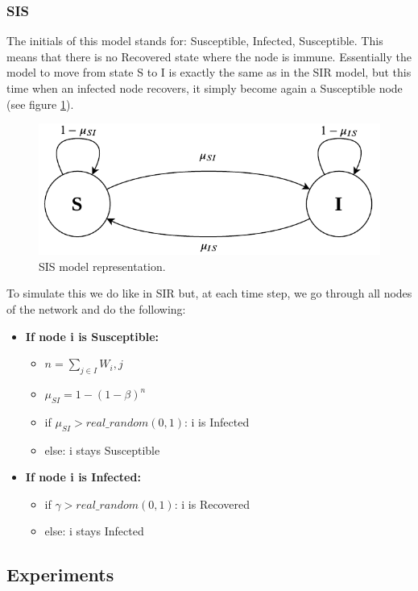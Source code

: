 \subsubsection{SIS}
The initials of this model stands for: Susceptible, Infected, Susceptible. This means that there is no Recovered state where the node is immune. Essentially the model to move from state S to I is exactly the same as in the SIR model, but this time when an infected node recovers, it simply become again a Susceptible node (see figure \ref{fig:sis}).
\begin{figure}[htbp]
    \centering
    \includegraphics[width=\linewidth]{../img/SIS_model.pdf}
    \caption{SIS model representation.}
    \label{fig:sis}
\end{figure}

To simulate this we do like in SIR but, at each time step, we go through all nodes of the network and do the following:
\begin{itemize}
    \item \textbf{If node i is Susceptible:} 
    \begin{itemize}
        \item[] $n=\sum_{j\in I}W_i,j$
        \item[] $\mu_{SI}=1-(1-\beta)^n$
        \item[] if $\mu_{SI}>real\_random(0,1)$: i is Infected
        \item[] else: i stays Susceptible  
    \end{itemize}
    \item \textbf{If node i is Infected:} 
    \begin{itemize}
        \item[] if $\gamma>real\_random(0,1)$: i is Recovered
        \item[] else: i stays Infected
    \end{itemize}
\end{itemize}
\subsection{Experiments}
\label{ssec:experiments}